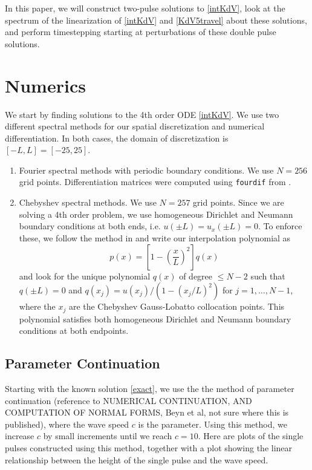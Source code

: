 \documentclass[12pt]{article}
\begin{document}
In this paper, we will construct two-pulse solutions to \eqref{intKdV}, look at the spectrum of the linearization of \eqref{intKdV} and \eqref{KdV5travel} about these solutions, and perform timestepping starting at perturbations of these double pulse solutions.

\section{Numerics}

We start by finding solutions to the 4th order ODE \eqref{intKdV}. We use two different spectral methods for our spatial discretization and numerical differentiation. In both cases, the domain of discretization is $[-L, L] = [-25, 25]$.

\begin{enumerate}
	\item Fourier spectral methods with periodic boundary conditions. We use $N = 256$ grid points. Differentiation matrices were computed using \texttt{fourdif} from \cite{Weideman2000}.
	\item Chebyshev spectral methods. We use $N = 257$ grid points. Since we are solving a 4th order problem, we use homogeneous Dirichlet and Neumann boundary conditions at both ends, i.e. $u(\pm L) = u_x(\pm L) = 0$. To enforce these, we follow the method in \cite{Trefethen2000} and write our interpolation polynomial as
	\begin{equation}
		p(x) = \left[ 1 - \left(\frac{x}{L}\right)^2\right]q(x)
	\end{equation}
	and look for the unique polynomial $q(x)$ of degree $\leq N-2$ such that $q(\pm L) = 0$ and $q(x_j) = u(x_j) / (1 - (x_j / L)^2)$ for $j = 1, \dots, N-1$, where the $x_j$ are the Chebyshev Gauss-Lobatto collocation points. This polynomial satisfies both homogeneous Dirichlet and Neumann boundary conditions at both endpoints.
\end{enumerate}

\subsection{Parameter Continuation}

Starting with the known solution \eqref{exact}, we use the the method of parameter continuation (reference to NUMERICAL CONTINUATION, AND COMPUTATION OF NORMAL FORMS, Beyn et al, not sure where this is published), where the wave speed $c$ is the parameter. Using this method, we increase $c$ by small increments until we reach $c = 10$. Here are plots of the single pulses constructed using this method, together with a plot showing the linear relationship between the height of the single pulse and the wave speed.
\end{document}
